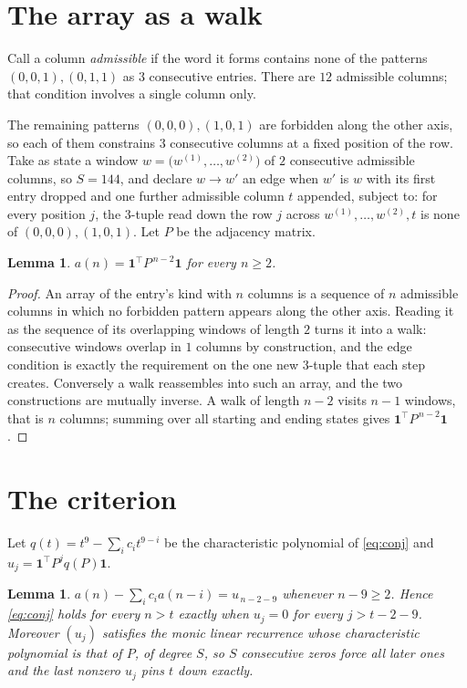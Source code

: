 \documentclass[11pt,a4paper]{article}
\theoremstyle{plain}
\newtheorem{lemma}[theorem]{Lemma}
\theoremstyle{definition}
\begin{document}
\section{The array as a walk}

Call a column \emph{admissible} if the word it forms contains none of the patterns
$(0,0,1), (0,1,1)$ as $3$ consecutive entries. There are $12$ admissible columns; that condition
involves a single column only.

The remaining patterns $(0,0,0), (1,0,1)$ are forbidden along the other axis, so each of them
constrains $3$ consecutive columns at a fixed position of the row. Take as state a
window $w=\bigl(w^{(1)},\dots,w^{(2)}\bigr)$ of $2$ consecutive admissible
columns, so $S=144$, and declare $w\to w'$ an edge when $w'$ is $w$ with its first entry
dropped and one further admissible column $t$ appended, subject to: for every position
$j$, the $3$-tuple read down the row $j$ across $w^{(1)},\dots,w^{(2)},t$
is none of $(0,0,0), (1,0,1)$. Let $P$ be the adjacency matrix.

\begin{lemma}\label{lem:walk}
$a(n)=\mathbf{1}^{\!\top}P^{\,n-2}\mathbf{1}$ for every $n\ge2$.
\end{lemma}

\begin{proof}
An array of the entry's kind with $n$ columns is a sequence of $n$ admissible columns in
which no forbidden pattern appears along the other axis. Reading it as the sequence of its
overlapping windows of length $2$ turns it into a walk: consecutive windows overlap in
$1$ columns by construction, and the edge condition is exactly the requirement on the one
new $3$-tuple that each step creates. Conversely a walk reassembles into such an array,
and the two constructions are mutually inverse. A walk of length $n-2$ visits $n-1$
windows, that is $n$ columns; summing over all starting and ending states gives
$\mathbf{1}^{\!\top}P^{\,n-2}\mathbf{1}$.
\end{proof}

\section{The criterion}

Let $q(t)=t^{9}-\sum_i c_i t^{9-i}$ be the characteristic polynomial of
\eqref{eq:conj} and $u_j=\mathbf{1}^{\!\top}P^{j}q(P)\mathbf{1}$.

\begin{lemma}\label{lem:crit}
$a(n)-\sum_i c_i a(n-i)=u_{\,n-2-9}$ whenever $n-9\ge2$. Hence
\eqref{eq:conj} holds for every $n>t$ exactly when $u_j=0$ for every
$j>t-2-9$. Moreover $(u_j)$ satisfies the monic linear recurrence whose
characteristic polynomial is that of $P$, of degree $S$, so $S$ consecutive zeros force all
later ones and the last nonzero $u_j$ pins $t$ down exactly.
\end{lemma}
\end{document}
